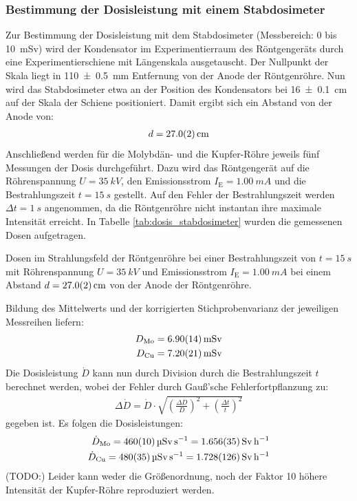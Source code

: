 \documentclass[11pt, a4paper]{article}
\numberwithin{equation}{section}
\newcommand{\korr}[1]{{\color{red}(#1)}}
\begin{document}
\subsubsection{Bestimmung der Dosisleistung mit einem Stabdosimeter}
Zur Bestimmung der Dosisleistung mit dem Stabdosimeter (Messbereich: \num{0} bis \SI{10}{mSv}) wird der Kondensator im Experimentierraum des Röntgengeräts durch eine Experimentierschiene mit Längenskala ausgetauscht.
Der Nullpunkt der Skala liegt in \SI{110 +- 0.5}{mm} Entfernung von der Anode der Röntgenröhre.
Nun wird das Stabdosimeter etwa an der Position des Kondensators bei \SI{16 +- 0.1}{cm} auf der Skala der Schiene positioniert.
Damit ergibt sich ein Abstand von der Anode von:
\begin{align*}
	d = \SI{27.0 +- 0.2}{cm}
\end{align*}
Anschließend werden für die Molybdän- und die Kupfer-Röhre jeweils fünf Messungen der Dosis durchgeführt.
Dazu wird das Röntgengerät auf die Röhrenspannung $U = \SI{35}{kV}$, den Emissionsstrom $I_\mathrm{E} = \SI{1.00}{mA}$ und die Bestrahlungszeit $t = \SI{15}{s}$ gestellt.
Auf den Fehler der Bestrahlungszeit werden $\Delta t = \SI{1}{s}$ angenommen, da die Röntgenröhre nicht instantan ihre maximale Intensität erreicht.
In Tabelle \ref{tab:dosis_stabdosimeter} wurden die gemessenen Dosen aufgetragen.
\begin{table}[ht]
	\centering
	
	\caption{Dosen im Strahlungsfeld der Röntgenröhre bei einer Bestrahlungszeit von $t=\SI{15}{s}$ mit Röhrenspannung $U=\SI{35}{kV}$ und Emissionsstrom $I_\mathrm{E} = \SI{1.00}{mA}$ bei einem Abstand $d=\SI{27 +- 0.2}{cm}$ von der Anode der Röntgenröhre.}
	\label{tab:dosis_stabdosimeter}
\end{table}
Bildung des Mittelwerts und der korrigierten Stichprobenvarianz der jeweiligen Messreihen liefern:
\begin{align*}
	D_\mathrm{Mo} = \SI{6.90 +- 0.14}{mSv} \\
	D_\mathrm{Cu} = \SI{7.20 +- 0.21}{mSv}
\end{align*}
Die Dosisleistung $\dot{D}$ kann nun durch Division durch die Bestrahlungszeit $t$ berechnet werden, wobei der Fehler durch Gauß'sche Fehlerfortpflanzung zu:
\begin{align}
	\Delta \dot{D} = \dot{D} \cdot \sqrt{\left( \frac{\Delta D}{D} \right)^2 + \left( \frac{\Delta t}{t} \right)^2}
\end{align}
gegeben ist.
Es folgen die Dosisleistungen:
\begin{align*}
	\dot{D}_\mathrm{Mo} = \SI{460 +- 10}{\micro\sievert\per\second} = \SI{1.656 +- 0.035}{\sievert\per\hour}\\
	\dot{D}_\mathrm{Cu} = \SI{480 +- 35}{\micro\sievert\per\second} = \SI{1.728 +- 0.126}{\sievert\per\hour}
\end{align*}
\korr{TODO:} Leider kann weder die Größenordnung, noch der Faktor 10 höhere Intensität der Kupfer-Röhre reproduziert werden.
\end{document}
